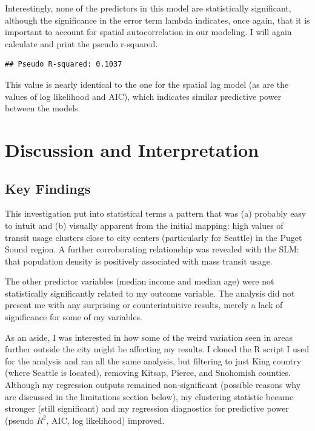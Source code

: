 \documentclass[
]{article}
\begin{document}
Interestingly, none of the predictors in this model are statistically
significant, although the significance in the error term lambda
indicates, once again, that it is important to account for spatial
autocorrelation in our modeling. I will again calculate and print the
pseudo r-squared.

\begin{verbatim}
## Pseudo R-squared: 0.1037
\end{verbatim}

This value is nearly identical to the one for the spatial lag model (as
are the values of log likelihood and AIC), which indicates similar
predictive power between the models.

\section{Discussion and
Interpretation}\label{discussion-and-interpretation}

\subsection{Key Findings}\label{key-findings}

This investigation put into statistical terms a pattern that was (a)
probably easy to intuit and (b) visually apparent from the initial
mapping: high values of transit usage clusters close to city centers
(particularly for Seattle) in the Puget Sound region. A further
corroborating relationship was revealed with the SLM: that population
density is positively associated with mass transit usage.

The other predictor variables (median income and median age) were not
statistically significantly related to my outcome variable. The analysis
did not present me with any surprising or counterintuitive results,
merely a lack of significance for some of my variables.

As an aside, I was interested in how some of the weird variation seen in
areas further outside the city might be affecting my results. I cloned
the R script I used for the analysis and ran all the same analysis, but
filtering to just King country (where Seattle is located), removing
Kitsap, Pierce, and Snohomish counties. Although my regression outputs
remained non-significant (possible reasons why are discussed in the
limitations section below), my clustering statistic became stronger
(still significant) and my regression diagnostics for predictive power
(pseudo \(R^2\), AIC, log likelihood) improved.
\end{document}
